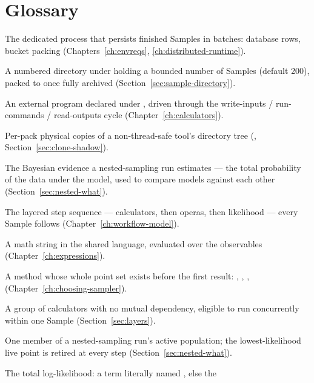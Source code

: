 \chapter{Glossary}
\label{app:glossary}

\begin{description}[style=nextline, leftmargin=1.2em]
  \item[Archiver] The dedicated process that persists finished Samples in batches:
        database rows, bucket packing (Chapters~\ref{ch:envreqs},
        \ref{ch:distributed-runtime}).
  \item[bucket] A numbered directory under  holding a bounded number of
        Samples (default 200), packed to  once fully archived
        (Section~\ref{sec:sample-directory}).
  \item[calculator] An external program declared under ,
        driven through the write-inputs / run-commands / read-outputs cycle
        (Chapter~\ref{ch:calculators}).
  \item[clone shadow] Per-pack physical copies of a non-thread-safe tool's directory
        tree (, Section~\ref{sec:clone-shadow}).
  \item[evidence ($\log Z$)] The Bayesian evidence a nested-sampling run estimates ---
        the total probability of the data under the model, used to compare models
        against each other (Section~\ref{sec:nested-what}).
  \item[execution plan] The layered step sequence --- calculators, then operas, then
        likelihood --- every Sample follows (Chapter~\ref{ch:workflow-model}).
  \item[expression] A math string in the shared language, evaluated over the
        observables (Chapter~\ref{ch:expressions}).
  \item[fixed-set sampler] A method whose whole point set exists before the first
        result: , , , 
        (Chapter~\ref{ch:choosing-sampler}).
  \item[layer] A group of calculators with no mutual dependency, eligible to run
        concurrently within one Sample (Section~\ref{sec:layers}).
  \item[live point] One member of a nested-sampling run's active population; the
        lowest-likelihood live point is retired at every step
        (Section~\ref{sec:nested-what}).
  \item[LogL] The total log-likelihood: a term literally named , else the

\end{description}
